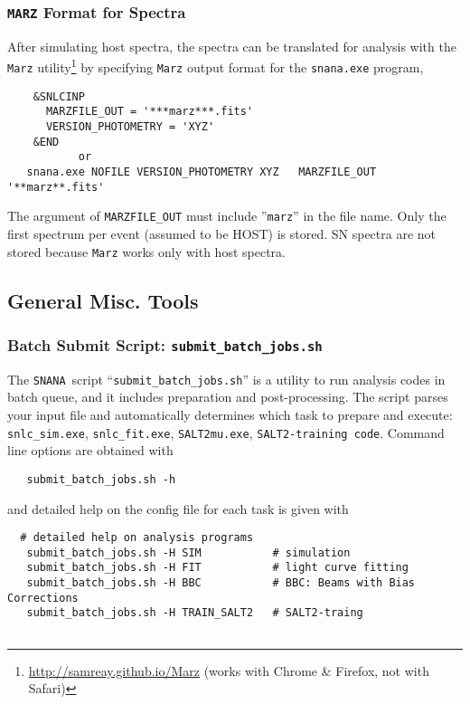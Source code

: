 \documentclass[12pt]{article}
\newcommand{\snana}{{\tt SNANA}}
\newcommand{\submit}{\tt submit\_batch\_jobs.sh}
\begin{document}
{%
   \subsubsection{{\tt MARZ} Format for Spectra}
   \label{sss:marz}

After simulating host spectra, the spectra can be translated 
for analysis with the {\tt Marz} 
utility\footnote{\url{http://samreay.github.io/Marz} 
    (works with Chrome \& Firefox, not with Safari)}
by specifying {\tt Marz} output format for the {\tt snana.exe} program,
%
\begin{verbatim}
    &SNLCINP
      MARZFILE_OUT = '***marz***.fits'
      VERSION_PHOTOMETRY = 'XYZ'
    &END
           or
   snana.exe NOFILE VERSION_PHOTOMETRY XYZ   MARZFILE_OUT '**marz**.fits'
\end{verbatim}
The argument of {\tt MARZFILE\_OUT} must include ''{\tt marz}'' in the
file name. Only the first spectrum per event (assumed to be HOST) 
is stored. SN spectra are not stored because {\tt Marz} works only
with host spectra. 


  \subsection{General Misc. Tools}
  \label{subsec:MiscTools_general}

  \subsubsection{Batch Submit Script: {\submit}}
  \label{sss:submit_batch}

The \snana\ script ``{\submit}'' is a utility to run analysis codes
in batch queue, and it includes preparation and post-processing.
The script parses your input file and automatically determines
which task to prepare and execute: 
{\tt snlc\_sim.exe}, {\tt snlc\_fit.exe}, 
{\tt SALT2mu.exe}, {\tt SALT2-training code}.
Command line options are obtained with
\begin{verbatim}
   submit_batch_jobs.sh -h
\end{verbatim}
and detailed help on the config file for each task is given with
\begin{verbatim}
  # detailed help on analysis programs
   submit_batch_jobs.sh -H SIM           # simulation
   submit_batch_jobs.sh -H FIT           # light curve fitting
   submit_batch_jobs.sh -H BBC           # BBC: Beams with Bias Corrections
   submit_batch_jobs.sh -H TRAIN_SALT2   # SALT2-traing 


\end{verbatim}}
\end{document}
